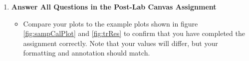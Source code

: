 \documentclass{article} %
\begin{document}
\begin{enumerate}
\begin{itemize}
\begin{itemize}
        \end{itemize}
        \item Set axis grid lines on, box off, and figure background color to white.
    \end{itemize}
    \item \textbf{Answer All Questions in the Post-Lab Canvas Assignment}
    \begin{itemize}
        \item Compare your plots to the example plots shown in figure \ref{fig:sampCalPlot} and \ref{fig:trRes} to confirm that you have completed the assignment correctly. Note that your values will differ, but your formatting and annotation should match.
    \end{itemize}
\end{enumerate}



%
%
%
%
%
%
%
%
\end{document}

